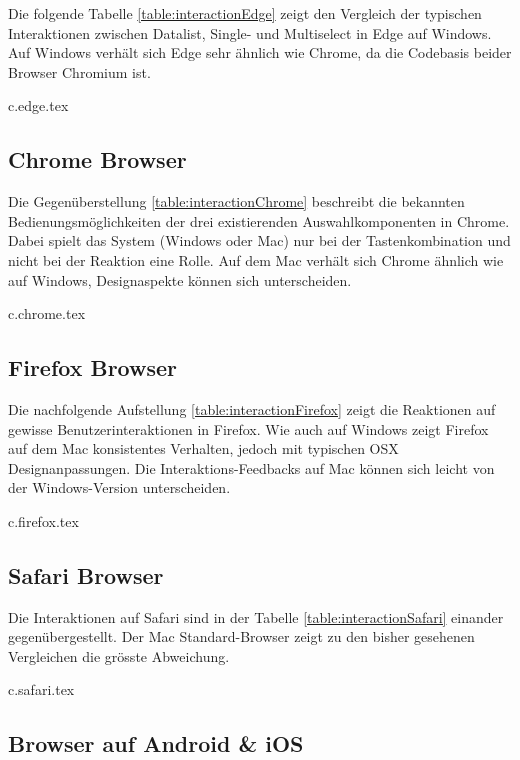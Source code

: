 Die folgende Tabelle \ref{table:interactionEdge} zeigt den Vergleich der typischen Interaktionen zwischen Datalist, Single- und Multiselect in Edge auf Windows.
Auf Windows verhält sich Edge sehr ähnlich wie Chrome, da die Codebasis beider Browser Chromium ist.

{c.edge.tex}


\clearpage
\subsection{Chrome Browser}
\label{sec:chromeBrowser}

Die Gegenüberstellung \ref{table:interactionChrome} beschreibt die bekannten Bedienungsmöglichkeiten der drei existierenden Auswahlkomponenten in Chrome.
Dabei spielt das System (Windows oder Mac) nur bei der Tastenkombination und nicht bei der Reaktion eine Rolle.
Auf dem Mac verhält sich Chrome ähnlich wie auf Windows, Designaspekte können sich unterscheiden. 

{c.chrome.tex}


\clearpage
\subsection{Firefox Browser}
\label{sec:firefoxBrowser}

Die nachfolgende Aufstellung \ref{table:interactionFirefox} zeigt die Reaktionen auf gewisse Benutzerinteraktionen in Firefox.
Wie auch auf Windows zeigt Firefox auf dem Mac konsistentes Verhalten, jedoch mit typischen OSX Designanpassungen. 
Die Interaktions-Feedbacks auf Mac können sich leicht von der Windows-Version unterscheiden.

{c.firefox.tex}


\clearpage
\subsection{Safari Browser}
\label{sec:safariBrowser}

Die Interaktionen auf Safari sind in der Tabelle \ref{table:interactionSafari} einander gegenübergestellt.
Der Mac Standard-Browser zeigt zu den bisher gesehenen Vergleichen die grösste Abweichung.

{c.safari.tex}


\clearpage
\subsection{Browser auf Android \& iOS}
\label{sec:mobileBrowser}

